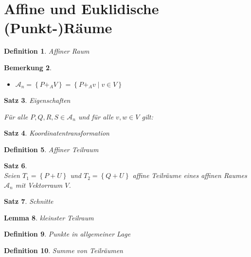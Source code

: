 \documentclass[%
a4paper,
10pt,           %
]
{scrartcl}
\theoremstyle{plain}
\newtheorem{mydef}{Definition}[section]
\theoremstyle{plain}
\newtheorem{mysatz}[mydef]{Satz}
\theoremstyle{plain}
\newtheorem{mylemma}[mydef]{Lemma}
\theoremstyle{plain}
\newtheorem{mybem}[mydef]{Bemerkung}
\theoremstyle{plain}
\begin{document}








\section{Affine und Euklidische (Punkt-)Räume} %
\label{sec:Affine und Euklidische (Punkt-)Räume}

\begin{mydef}
    Affiner Raum
\end{mydef}

\begin{mybem}
    \begin{itemize}
        \item $\mathcal{A}_n = \left\{ P +_A V \right\} = \left\{ P +_A v \mid v \in V \right\}$
    \end{itemize}
\end{mybem}

\begin{mysatz}
    Eigenschaften

    Für alle $P,Q,R,S \in \mathcal{A}_n$ und  für alle $v,w \in V$ gilt:
\end{mysatz}

\begin{mysatz}
    Koordinatentransformation
\end{mysatz}

\begin{mydef}
    Affiner Teilraum
\end{mydef}

\begin{mysatz}
    \ \\
    Seien $T_1 = \left\{ P+U \right\}$ und $T_2 = \left\{ Q+U \right\}$ affine Teilräume eines affinen Raumes $\mathcal{A}_n$ mit Vektorraum $V$.
\end{mysatz}

\begin{mysatz}
    Schnitte
\end{mysatz}

\begin{mylemma}
    kleinster Teilraum
\end{mylemma}

\begin{mydef}
    Punkte in allgemeiner Lage
\end{mydef}

\begin{mydef}
    Summe von Teilräumen
\end{mydef}
\end{document}
